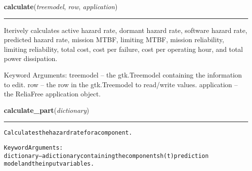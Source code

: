    \label{reliafree:calculations:calculate}

    \vspace{0.5ex}

\hspace{.8\funcindent}\begin{boxedminipage}{\funcwidth}

    \raggedright \textbf{calculate}(\textit{treemodel}, \textit{row}, \textit{application})

    \vspace{-1.5ex}

    \rule{\textwidth}{0.5\fboxrule}
\setlength{\parskip}{2ex}
    Iterively calculates active hazard rate, dormant hazard rate, software 
    hazard rate, predicted hazard rate, mission MTBF, limiting MTBF, 
    mission reliability, limiting reliability, total cost, cost per 
    failure, cost per operating hour, and total power dissipation.

    Keyword Arguments: treemodel   -- the gtk.Treemodel containing the 
    information to edit. row         -- the row in the gtk.Treemodel to 
    read/write values. application -- the ReliaFree application object.

\setlength{\parskip}{1ex}
    \end{boxedminipage}

    \label{reliafree:calculations:calculate_part}

    \vspace{0.5ex}

\hspace{.8\funcindent}\begin{boxedminipage}{\funcwidth}

    \raggedright \textbf{calculate\_part}(\textit{dictionary})

    \vspace{-1.5ex}

    \rule{\textwidth}{0.5\fboxrule}
\setlength{\parskip}{2ex}
\begin{alltt}
Calculates the hazard rate for a component.

Keyword Arguments:
dictionary -- a dictionary containing the components h(t) prediction
              model and the input variables.
\end{alltt}

\setlength{\parskip}{1ex}
    \end{boxedminipage}

